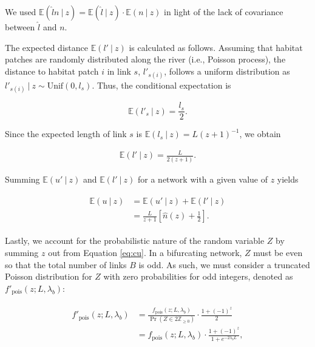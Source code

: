 \documentclass[11pt, class=article, crop=false]{standalone}
\begin{document}
We used $\mathbb{E}(\hat{l}n ~|~ z) = \mathbb{E}(\hat{l} ~|~ z) \cdot \mathbb{E}(n ~|~ z)$ in light of the lack of covariance between $\hat{l}$ and $n$.

The expected distance $\mathbb{E}(l'~|~z)$ is calculated as follows.
Assuming that habitat patches are randomly distributed along the river (i.e., Poisson process), the distance to habitat patch $i$ in link $s$, $l'_{s(i)}$, follows a uniform distribution as $l'_{s(i)}~|~z \sim \mbox{Unif}(0, l_s)$.
Thus, the conditional expectation is

\begin{equation}
    \mathbb{E}(l'_{s}~|~z) = \frac{l_s}{2}.
\end{equation}

Since the expected length of link $s$ is $\mathbb{E}(l_s~|~z) = L(z+1)^{-1}$, we obtain

\begin{align}
    \mathbb{E}(l'~|~z) = \frac{L}{2(z + 1)}.
\end{align}

Summing $\mathbb{E}(u' ~|~ z)$ and $\mathbb{E}(l'~|~z)$ for a network with a given value of $z$ yields

\begin{align}
    \begin{split}
        \mathbb{E}(u ~|~ z) 
        &= \mathbb{E}(u' ~|~ z) + \mathbb{E}(l'~|~z)\\
        &= \frac{L}{z+1} \left[ \hat{n}(z) + \frac{1}{2} \right].
    \end{split}
    \label{eq:cu}
\end{align}

Lastly, we account for the probabilistic nature of the random variable $Z$ by summing $z$ out from Equation \ref{eq:cu}.
In a bifurcating network, $Z$ must be even so that the total number of links $B$ is odd.
As such, we must consider a truncated Poisson distribution for $Z$ with zero probabilities for odd integers, denoted as $f'_{\text{pois}}(z; L, \lambda_b)$:

\begin{align}
    \begin{split}
    f'_{\text{pois}}(z; L, \lambda_b) 
    &= \frac{f_{\text{pois}}(z; L, \lambda_b)}{\Pr(Z \in 2\mathbb{Z}_{\ge 0})} \cdot \frac{1 + (-1)^{z}}{2}\\
    &= f_{\text{pois}}(z; L, \lambda_b) \cdot \frac{1 + (-1)^{z}}{1 + e^{-2\lambda_b L}},
    \end{split}
    \label{eq:tpois}
\end{align}
\end{document}
